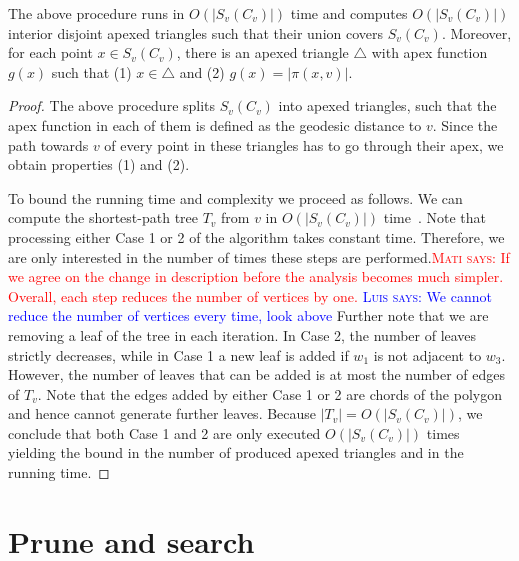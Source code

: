 \documentclass[a4paper,UKenglish]{lipics}
\newcommand{\fn}[2]{\ensuremath{S_{\scriptscriptstyle #1}(#2)}}
\newcommand{\g}[2]{\ensuremath{|\pi(#1, #2)|}}
\newcommand{\marrow}{\marginpar[\hfill$\longrightarrow$]{$\longleftarrow$}}
\newcommand{\niceremark}[3]{\textcolor{red}{\textsc{#1 #2:} \marrow\textsf{#3}}}
\newcommand{\niceremarkblue}[3]{\textcolor{blue}{\textsc{#1 #2:} \marrow\textsf{#3}}}
\newcommand{\luis}[2][says]{\niceremarkblue{Luis}{#1}{#2}}
\newcommand{\mati}[2][says]{\niceremark{Mati}{#1}{#2}}
\begin{document}
\begin{lemma}\label{lemma:Triangles inside funnels}
The above procedure runs in $O(|\fn{v}{C_v}|)$ time and computes $O(|\fn{v}{C_v}|)$ interior disjoint apexed triangles such that their union covers $\fn{v}{C_v}$. Moreover, for each point $x\in \fn{v}{C_v}$, there is an apexed triangle $\triangle$ with apex function $g(x)$ such that (1) $x\in \triangle$ and (2) $g(x) = \g{x}{v}$.
\end{lemma}
\begin{proof}
The above procedure splits $\fn{v}{C_v}$ into apexed triangles, such that the apex function in each of them is defined as the geodesic distance to $v$. Since the path towards $v$ of every point in these triangles has to go through their apex, we obtain properties (1) and (2).

To bound the running time and complexity we proceed as follows. 
We can compute the shortest-path tree $T_v$ from $v$ in $O(|\fn{v}{C_v}|)$ time~\cite{guibasShortestPathTree}.
Note that processing either Case 1 or 2 of the algorithm takes constant time. Therefore, we are only interested in the number of times these steps are performed.\mati{If we agree on the change in description before the analysis becomes much simpler. Overall, each step reduces the number of vertices by one.} \luis{We cannot reduce the number of vertices every time, look above} Further note that we are removing a leaf of the tree in each iteration. In Case 2, the number of leaves strictly decreases, while in Case 1 a new leaf is added if $w_1$ is not adjacent to $w_3$. However, the number of leaves that can be added is at most the number of edges of $T_v$. 
Note that the edges added by either Case 1 or 2 are chords of the polygon and hence cannot generate further leaves. 
Because $|T_v| = O(|\fn{v}{C_v}|)$, we conclude that both Case 1 and 2 are only executed $O(|\fn{v}{C_v}|)$ times yielding the bound in the number of produced apexed triangles and in the running time.
\end{proof}

\section{Prune and search}\label{section:Prune and search}
\end{document}
